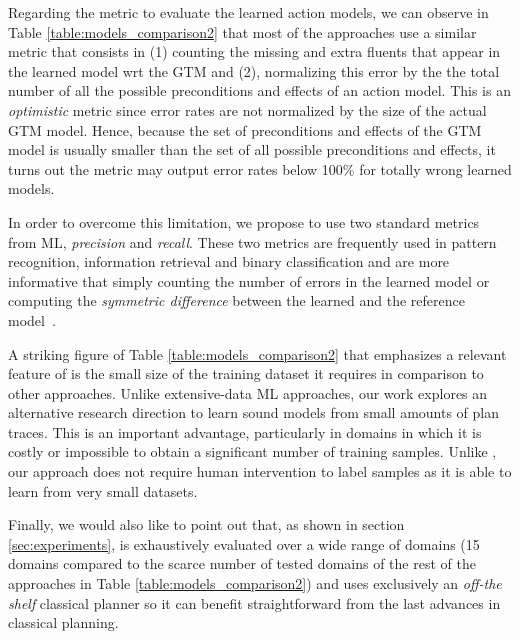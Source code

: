 Regarding the metric to evaluate the learned action models, we can observe in Table \ref{table:models_comparison2} that most of the approaches use a similar metric that consists in (1) counting the missing and extra fluents that appear in the learned model wrt the GTM and (2), normalizing this error by the the total number of all the possible preconditions and effects of an action model. This is an \emph{optimistic} metric since error rates are not normalized by the size of the actual GTM model. Hence, because the set of preconditions and effects of the GTM model is usually smaller than the set of all possible preconditions and effects, it turns out the metric may output error rates below 100\% for totally wrong learned models.


In order to overcome this limitation, we propose to use two standard metrics from ML, {\em precision} and {\em recall}. These two metrics are frequently used in pattern recognition, information retrieval and binary classification and are more informative that simply counting the number of errors in the learned model or computing the {\em symmetric difference} between the learned and the reference model~\cite{davis2006relationship}.

A striking figure of Table \ref{table:models_comparison2} that emphasizes a relevant feature of \FAMA is the small size of the training dataset it requires in comparison to other approaches. Unlike extensive-data ML approaches, our work explores an alternative research direction to learn sound models from small amounts of plan traces. This is an important advantage, particularly in domains in which it is costly or impossible to obtain a significant number of training samples. Unlike \CAMA, our approach does not require human intervention to label samples as it is able to learn from very small datasets.

Finally, we would also like to point out that, as shown in section \ref{sec:experiments}, \FAMA is exhaustively evaluated over a wide range of domains (15 domains compared to the scarce number of tested domains of the rest of the approaches in Table \ref{table:models_comparison2}) and uses exclusively an \emph{off-the shelf} classical planner so it can benefit straightforward from the last advances in classical planning.




























